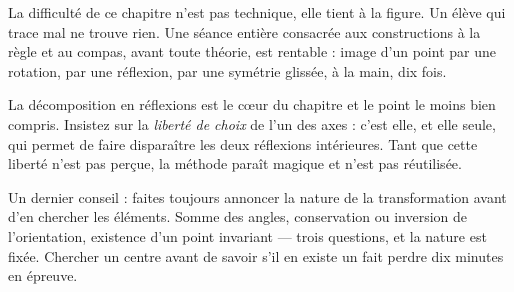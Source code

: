 \begin{notepourlaclasse}
La difficulté de ce chapitre n'est pas technique, elle tient à la figure. Un
élève qui trace mal ne trouve rien. Une séance entière consacrée aux
constructions à la règle et au compas, avant toute théorie, est rentable :
image d'un point par une rotation, par une réflexion, par une symétrie
glissée, à la main, dix fois.

La décomposition en réflexions est le cœur du chapitre et le point le moins
bien compris. Insistez sur la \emph{liberté de choix} de l'un des axes :
c'est elle, et elle seule, qui permet de faire disparaître les deux
réflexions intérieures. Tant que cette liberté n'est pas perçue, la méthode
paraît magique et n'est pas réutilisée.

Un dernier conseil : faites toujours annoncer la nature de la transformation
avant d'en chercher les éléments. Somme des angles, conservation ou inversion
de l'orientation, existence d'un point invariant — trois questions, et la
nature est fixée. Chercher un centre avant de savoir s'il en existe un fait
perdre dix minutes en épreuve.
\end{notepourlaclasse}
